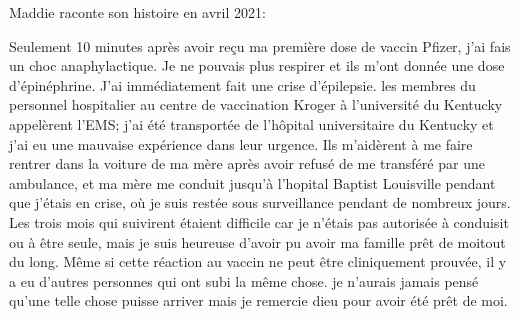 Maddie raconte son histoire en avril 2021:

Seulement 10 minutes après avoir reçu ma première dose de vaccin Pfizer, j'ai
fais un choc anaphylactique. Je ne pouvais plus respirer et ils m'ont donnée une
dose d'épinéphrine. J'ai immédiatement fait une crise d'épilepsie. les membres
du personnel hospitalier au centre de vaccination Kroger à l'université du
Kentucky appelèrent l'EMS; j'ai été transportée de l'hôpital universitaire du
Kentucky et j'ai eu une mauvaise expérience dans leur urgence. Ils m'aidèrent à
me faire rentrer dans la voiture de ma mère après avoir refusé de me transféré
par une ambulance, et ma mère me conduit jusqu'à l'hopital Baptist Louisville
pendant que j'étais en crise, où je suis restée sous surveillance pendant de
nombreux jours. Les trois mois qui suivirent étaient difficile car je n'étais
pas autorisée à conduisit ou à être seule, mais je suis heureuse d'avoir pu
avoir ma famille prêt de moitout du long. Même si cette réaction au vaccin ne
peut être cliniquement prouvée, il y a eu d'autres personnes qui ont subi la
même chose. je n'aurais jamais pensé qu'une telle chose puisse arriver mais je
remercie dieu pour avoir été prêt de moi.

